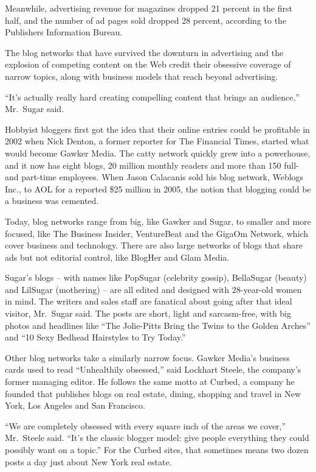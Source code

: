 ﻿\documentclass[12pt]{article}
\begin{document}
Meanwhile, advertising revenue for magazines dropped 21 percent in the first half, and the number of
ad pages sold dropped 28 percent, according to the Publishers Information Bureau.

The blog networks that have survived the downturn in advertising and the explosion of competing
content on the Web credit their obsessive coverage of narrow topics, along with business models that
reach beyond advertising.

``It's actually really hard creating compelling content that brings an audience,'' Mr.~Sugar said.

Hobbyist bloggers first got the idea that their online entries could be profitable in 2002 when Nick
Denton, a former reporter for The Financial Times, started what would become Gawker Media. The catty
network quickly grew into a powerhouse, and it now has eight blogs, 20 million monthly readers and
more than 150 full- and part-time employees. When Jason Calacanis sold his blog network, Weblogs
Inc., to AOL for a reported \$25 million in 2005, the notion that blogging could be a business was
cemented.

Today, blog networks range from big, like Gawker and Sugar, to smaller and more focused, like The
Business Insider, VentureBeat and the GigaOm Network, which cover business and technology. There are
also large networks of blogs that share ads but not editorial control, like BlogHer and Glam Media.

Sugar's blogs -- with names like PopSugar (celebrity gossip), BellaSugar (beauty) and LilSugar
(mothering) -- are all edited and designed with 28-year-old women in mind. The writers and sales
staff are fanatical about going after that ideal visitor, Mr.~Sugar said. The posts are short, light
and sarcasm-free, with big photos and headlines like ``The Jolie-Pitts Bring the Twins to the Golden
Arches'' and ``10 Sexy Bedhead Hairstyles to Try Today.''

Other blog networks take a similarly narrow focus. Gawker Media's business cards used to read
``Unhealthily obsessed,'' said Lockhart Steele, the company's former managing editor. He follows the
same motto at Curbed, a company he founded that publishes blogs on real estate, dining, shopping and
travel in New York, Los Angeles and San Francisco.

``We are completely obsessed with every square inch of the areas we cover,'' Mr.~Steele said. ``It's
the classic blogger model: give people everything they could possibly want on a topic.'' For the
Curbed sites, that sometimes means two dozen posts a day just about New York real estate.
\end{document}
